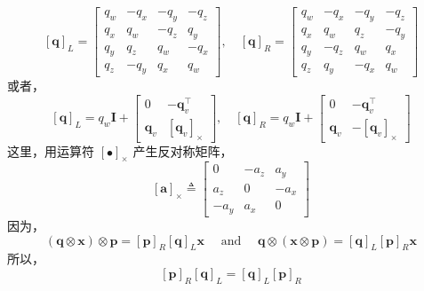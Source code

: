 \begin{equation}
\label{eqn:2.28}
[\mathbf{q}]_{L}=\left[ \begin{array}{cccc}{q_{w}} & {-q_{x}} & {-q_{y}} & {-q_{z}} \\ {q_{x}} & {q_{w}} & {-q_{z}} & {q_{y}} \\ {q_{y}} & {q_{z}} & {q_{w}} & {-q_{x}} \\ {q_{z}} & {-q_{y}} & {q_{x}} & {q_{w}}\end{array}\right], \quad[\mathbf{q}]_{R}=\left[ \begin{array}{cccc}{q_{w}} & {-q_{x}} & {-q_{y}} & {-q_{z}} \\ {q_{x}} & {q_{w}} & {q_{z}} & {-q_{y}} \\ {q_{y}} & {-q_{z}} & {q_{w}} & {q_{x}} \\ {q_{z}} & {q_{y}} & {-q_{x}} & {q_{w}}\end{array}\right]
\end{equation}
或者，
\begin{equation}
\label{eqn:2.29}
[\mathbf{q}]_{L}=q_{w} \mathbf{I}+\left[ \begin{array}{cc}{0} & {-\mathbf{q}_{v}^{\top}} \\ {\mathbf{q}_{v}} & {\left[\mathbf{q}_{v}\right]_{ \times}}\end{array}\right], \quad[\mathbf{q}]_{R}=q_{w} \mathbf{I}+\left[ \begin{array}{cc}{0} & {-\mathbf{q}_{v}^{\top}} \\ {\mathbf{q}_{v}} & {-\left[\mathbf{q}_{v}\right]_{ \times}}\end{array}\right]
\end{equation}
这里，用运算符 $[\bullet]_{\times} $ 产生反对称矩阵，
\begin{equation}
\label{eqn:2.30}
[\mathbf{a}]_{ \times} \triangleq \left[ \begin{array}{ccc}{0} & {-a_{z}} & {a_{y}} \\ {a_{z}} & {0} & {-a_{x}} \\ {-a_{y}} & {a_{x}} & {0}\end{array}\right]
\end{equation}
因为，
\begin{equation}
\label{eqn:2.31}
(\mathbf{q} \otimes \mathbf{x}) \otimes \mathbf{p}=[\mathbf{p}]_{R}[\mathbf{q}]_{L} \mathbf{x} \quad \text { and } \quad \mathbf{q} \otimes(\mathbf{x} \otimes \mathbf{p})=[\mathbf{q}]_{L}[\mathbf{p}]_{R} \mathbf{x}
\end{equation}
所以，
\begin{equation}
\label{eqn:2.32}
[\mathbf{p}]_{R}[\mathbf{q}]_{L}=[\mathbf{q}]_{L}[\mathbf{p}]_{R}
\end{equation}

